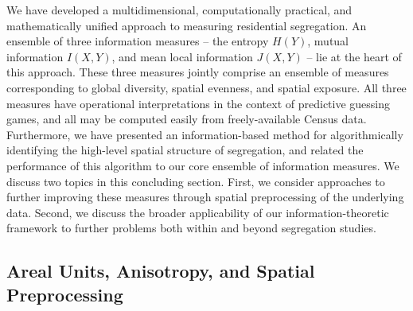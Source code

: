 \documentclass[english]{scrartcl}
\begin{document}
	We have developed a multidimensional, computationally practical, and mathematically unified approach to measuring residential segregation. An ensemble of three information measures -- the entropy $H(Y)$, mutual information $I(X,Y)$, and mean local information $J(X,Y)$ -- lie at the heart of this approach. These three measures jointly comprise an ensemble of measures corresponding to global diversity, spatial evenness, and spatial exposure. All three measures have operational interpretations in the context of predictive guessing games, and all may be computed easily from freely-available Census data. Furthermore, we have presented an information-based method for algorithmically identifying the high-level spatial structure of segregation, and related the performance of this algorithm to our core ensemble of information measures. We discuss two topics in this concluding section. First, we consider approaches to further improving these measures through spatial preprocessing of the underlying data. Second, we discuss the broader applicability of our information-theoretic framework to further problems both within and beyond segregation studies. 

	\subsection*{Areal Units, Anisotropy, and Spatial Preprocessing}
\end{document}

